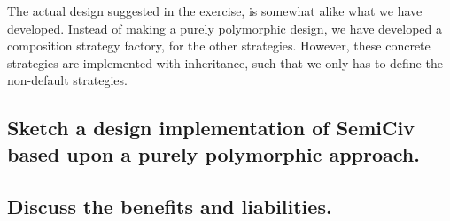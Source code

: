 The actual design suggested in the exercise, is somewhat alike what we have
developed.
Instead of making a purely polymorphic design, we have developed a composition
strategy factory, for the other strategies.
However, these concrete strategies are implemented with inheritance, such
that we only has to define the non-default strategies.

\subsection*{ Sketch a design implementation of SemiCiv based upon a purely
    polymorphic approach. }

\subsection*{ Discuss the benefits and liabilities. }

